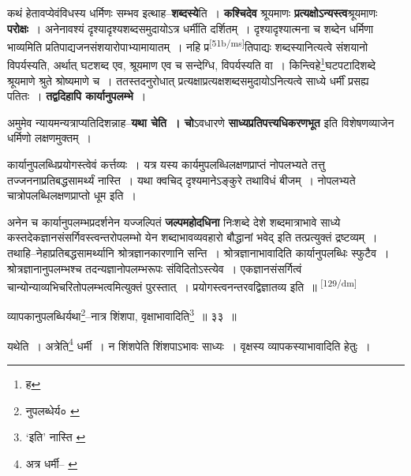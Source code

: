 \documentclass[article,12pt,a4paper]{memoir}
\begin{document}
	  \pstart कथं हेतावप्येवंविधस्य धर्मिणः सम्भव इत्थाह--\textbf{शब्दस्ये}ति । \textbf{कश्चिदेव} श्रूयमाणः \textbf{प्रत्यक्षोऽन्यस्त्व}श्रूयमाणः \textbf{परोक्षः} । अनेनावश्यं दृश्यादृश्यशब्दसमुदायोऽत्र धर्मीति दर्शितम् । दृश्यादृश्यात्मना च शब्देन धर्मिणा भाव्यमिति प्रतिपाद्यजनसंशयारोपाभ्यामायातम् । नहि प्र\leavevmode\textsuperscript{\rmlatinfont\tiny [51b/ms]}तिपाद्यः शब्दस्यानित्यत्वे संशयानो विपर्यस्यति, अर्थात् घटशब्द एव, श्रूयमाण एव च सन्देग्धि, विपर्यस्यति वा । किन्त्विहे\footnote{ह}घटपटादिशब्दे श्रूयमाणे श्रुते श्रोष्यमाणे च । ततस्तदनुरोधात् प्रत्यक्षाप्रत्यक्षशब्दसमुदायोऽनित्यत्वे साध्ये धर्मीं प्रसह्य पतितः । \textbf{तद्वदिहापि कार्यानुपलम्भे} ।
	\pend
      

	  \pstart अमुमेव न्यायमन्यत्राप्यतिदिशन्नाह--\textbf{यथा चेति । चो}ऽवधारणे \textbf{साध्यप्रतिपत्त्यधिकरणभूत} इति विशेषणव्याजेन धर्मिणो लक्षणमुक्तम् ।
	\pend
      

	  \pstart कार्यानुपलब्धिप्रयोगस्त्वेवं कर्त्तव्यः । यत्र यस्य कार्यमुपलब्धिलक्षणप्राप्तं नोपलभ्यते तत्तु तज्जननाप्रतिबद्धसामर्थ्यं नास्ति । यथा क्वचिद् दृश्यमानेऽङ्कुरे तथाविधं बीजम् । नोपलभ्यते चात्रोपलब्धिलक्षणप्राप्तो धूम इति ।
	\pend
      

	  \pstart अनेन च कार्यानुपलम्भप्रदर्शनेन यज्जल्पितं \textbf{जल्पमहोदधिना} निःशब्दे देशे शब्दमात्राभावे साध्ये कस्तदेकज्ञानसंसर्गिवस्त्वन्तरोपलम्भो येन शब्दाभावव्यवहारो बौद्धानां भवेद् इति तत्प्रत्युक्तं द्रष्टव्यम् । तथाहि--नेहाप्रतिबद्धसामर्थ्यानि श्रोत्रज्ञानकारणानि सन्ति । श्रोत्रज्ञानाभावादिति कार्यानुपलब्धिः स्फुटैव । श्रोत्रज्ञानानुपलम्भश्च तदन्यज्ञानोपलम्भरूपः संविदितोऽस्त्येव । एकज्ञानसंसर्गित्वं चान्योन्याव्यभिचरितोपलम्भत्वमित्युक्तं पुरस्तात् । प्रयोगस्त्वनन्तरवद्विज्ञातव्य इति ॥
	\pend
      \leavevmode\textsuperscript{\rmlatinfont\tiny [129/dm]}

	  \pstart व्यापकानुपलब्धिर्यथा\footnote{नुपलब्धेर्य० \cite{dp-msC}}--नात्र शिंशपा, वृक्षाभावादिति\footnote{‘इति’ नास्ति \cite{dp-edE}} ॥ ३३ ॥
	\pend
       

	  \pstart यथेति । अत्रेति\footnote{अत्र धर्मी--\cite{dp-msA} \cite{dp-msB} \cite{dp-edP} \cite{dp-edH} \cite{dp-edE}} धर्मी । न शिंशपेति शिंशपाऽभावः साध्यः । वृक्षस्य व्यापकस्याभावादिति हेतुः ।
	\pend
       
\end{document}
